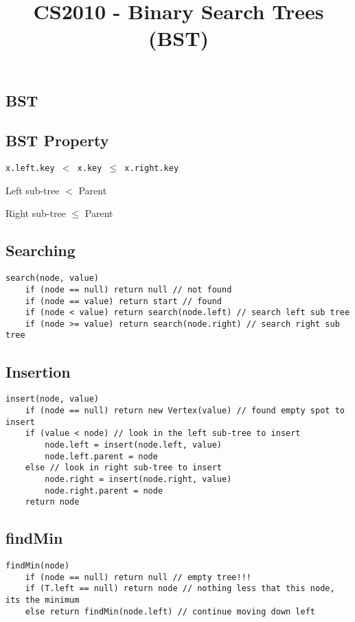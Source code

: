 \documentclass[12pt]{article}
\title{\textbf{CS2010 - Binary Search Trees (BST)}}
\date{}
\begin{document}
\maketitle

\begin{spacing}{1.5}

\section{BST}

\subsection{BST Property}

\texttt{x.left.key $<$ x.key $\le$ x.right.key}

Left sub-tree $<$ Parent 

Right sub-tree $\le$ Parent

\subsection{Searching}

\begin{verbatim}
search(node, value)
    if (node == null) return null // not found
    if (node == value) return start // found
    if (node < value) return search(node.left) // search left sub tree
    if (node >= value) return search(node.right) // search right sub tree 
\end{verbatim}

\subsection{Insertion}

\begin{verbatim}
insert(node, value) 
    if (node == null) return new Vertex(value) // found empty spot to insert
    if (value < node) // look in the left sub-tree to insert
        node.left = insert(node.left, value) 
        node.left.parent = node
    else // look in right sub-tree to insert
        node.right = insert(node.right, value)
        node.right.parent = node
    return node
\end{verbatim}
 

\subsection{findMin}

\begin{verbatim}
findMin(node)
    if (node == null) return null // empty tree!!!
    if (T.left == null) return node // nothing less that this node, its the minimum
    else return findMin(node.left) // continue moving down left 
\end{verbatim}


\end{spacing}
\end{document}

